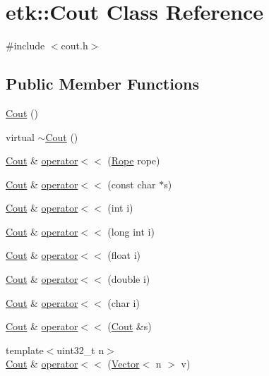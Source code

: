 \hypertarget{classetk_1_1_cout}{\section{etk\-:\-:Cout Class Reference}
\label{classetk_1_1_cout}
}


{\ttfamily \#include $<$cout.\-h$>$}

\subsection*{Public Member Functions}
\begin{DoxyCompactItemize}
\item 
\hyperlink{classetk_1_1_cout_ae24c5ae74f4ae7900153353dc9c7e3f3}{Cout} ()
\item 
virtual \hyperlink{classetk_1_1_cout_aee2ed09de157517ae5521433e86f10a4}{$\sim$\-Cout} ()
\item 
\hyperlink{classetk_1_1_cout}{Cout} \& \hyperlink{classetk_1_1_cout_a1aad31552d7c849d13f0b797d8d36956}{operator$<$$<$} (\hyperlink{classetk_1_1_rope}{Rope} rope)
\item 
\hyperlink{classetk_1_1_cout}{Cout} \& \hyperlink{classetk_1_1_cout_ada9c87da971f6e580501bb37593c20f7}{operator$<$$<$} (const char $\ast$s)
\item 
\hyperlink{classetk_1_1_cout}{Cout} \& \hyperlink{classetk_1_1_cout_a1111162c6be692de6037d4f621a29f93}{operator$<$$<$} (int i)
\item 
\hyperlink{classetk_1_1_cout}{Cout} \& \hyperlink{classetk_1_1_cout_aa6c8a19e7522c59ca021f9bdcf331205}{operator$<$$<$} (long int i)
\item 
\hyperlink{classetk_1_1_cout}{Cout} \& \hyperlink{classetk_1_1_cout_a8c8b14467c2d3815f7c834a6649b1ba3}{operator$<$$<$} (float i)
\item 
\hyperlink{classetk_1_1_cout}{Cout} \& \hyperlink{classetk_1_1_cout_a041028b993dd2d4872b05515ff0ac1f6}{operator$<$$<$} (double i)
\item 
\hyperlink{classetk_1_1_cout}{Cout} \& \hyperlink{classetk_1_1_cout_a7cb9540b3364e250db718ac3e4067827}{operator$<$$<$} (char i)
\item 
\hyperlink{classetk_1_1_cout}{Cout} \& \hyperlink{classetk_1_1_cout_a8f79a3867ce2a198b2d240728036913a}{operator$<$$<$} (\hyperlink{classetk_1_1_cout}{Cout} \&s)
\item 
{\footnotesize template$<$uint32\-\_\-t n$>$ }\\\hyperlink{classetk_1_1_cout}{Cout} \& \hyperlink{classetk_1_1_cout_acb00457610f99b47aacd2ee7f0bb71db}{operator$<$$<$} (\hyperlink{classetk_1_1_vector}{Vector}$<$ n $>$ v)

\end{DoxyCompactItemize}
